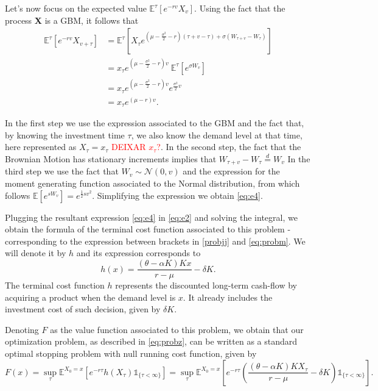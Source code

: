 Let's now focus on the expected value $\mathds{E}^{\tau}\left[   e^{-rv }  X_{v} \right]$.
Using the fact that the process \textbf{X} is a GBM, it follows that
\begin{align}
\mathds{E}^{\tau}\left[   e^{-rv } X_{v+\tau} \right] 
&= \mathds{E}^{\tau}\left[   X_\tau e^{\left(\mu- \frac{\sigma^2}{2}-r \right) (\tau+v-\tau) + \sigma (W_{\tau+v}-W_\tau)}\right] \nonumber \\
&=x_\tau e^{\left(\mu- \frac{\sigma^2}{2}-r \right) v} \ \mathds{E}^{\tau}\left[ e^{\sigma W_v} \right] \nonumber \\
&= x_\tau e^{\left(\mu- \frac{\sigma^2}{2}-r \right) v} e^{ \frac{\sigma^2}{2} v} \nonumber \\
&=x_\tau e^{(\mu-r)v}.
\label{eq:e4}
\end{align}


In the first step we use the expression associated to the GBM and the fact that, by knowing the investment time $\tau$, we also know the demand level at that time, here represented as $X_\tau=x_\tau$ \textcolor{red}{DEIXAR $x_\tau$?}. In the second step, the fact that the Brownian Motion has stationary increments implies that $W_{\tau+v}-W_\tau \overset{d}{=}  W_v$
In the third step we use the fact that $ W_v \sim \mathcal{N}(0,v)$ and the expression for the moment generating function associated to the Normal distribution, from which follows $\mathds{E}\left[e^{sW_v}\right]=e^{\frac{1}{2} s v^2}$. Simplifying the expression we obtain \eqref{eq:e4}.

Plugging the resultant expression \eqref{eq:e4} in \eqref{eq:e2} and solving the integral, we obtain the formula of the terminal cost function associated to this problem - corresponding to the expression between brackets in \eqref{probjj} and \eqref{eq:probm}. We will denote it by $h$ and its expression corresponds to
\begin{equation}
h(x)=\frac{(\theta-\alpha K)K x}{r-\mu}- \delta K.
\label{prob1:h}
\end{equation}
The terminal cost function $h$ represents the discounted long-term cash-flow by acquiring a product when the demand level is $x$. It already includes the investment cost of such decision, given by $\delta K$.
 
Denoting $F$ as the value function associated to this problem, we obtain that our optimization problem, as described in \eqref{eq:probz}, can be written as a standard optimal stopping problem with null running cost function, given by
\begin{equation}
F(x)=\sup_\tau \mathds{E}^{X_0=x}\left[e^{-r\tau } h(X_\tau) \mathds{1}_{\{\tau<\infty\}} \right]=\sup_\tau \mathds{E}^{X_0=x}\left[e^{-r\tau } \left( \frac{(\theta-\alpha K)K X_\tau}{r-\mu}-\delta K \right) \mathds{1}_{\{\tau<\infty\}} \right].
\label{eq:prob3}
\end{equation}


